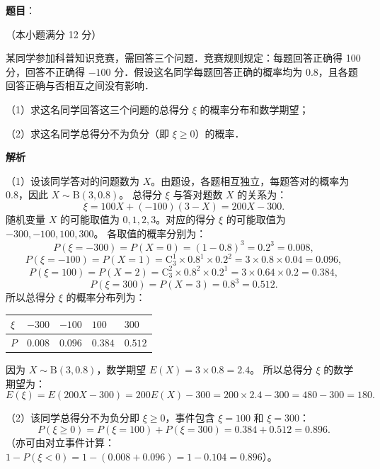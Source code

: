 \begin{answer}

\textbf{题目}：

（本小题满分 12 分）

某同学参加科普知识竞赛，需回答三个问题．竞赛规则规定：每题回答正确得 100 分，回答不正确得 $-100$ 分．假设这名同学每题回答正确的概率均为 0.8，且各题回答正确与否相互之间没有影响．

（1）求这名同学回答这三个问题的总得分 $\xi$ 的概率分布和数学期望；

（2）求这名同学总得分不为负分（即 $\xi\geqslant 0$）的概率．

\textbf{解析}

（1）设该同学答对的问题数为 $X$。由题设，各题相互独立，每题答对的概率为 0.8，因此 $X\sim\mathrm{B}(3,0.8)$。
总得分 $\xi$ 与答对题数 $X$ 的关系为：
\nopagebreak[4]
\[
\xi=100X+(-100)(3-X)=200X-300.
\]
随机变量 $X$ 的可能取值为 $0,1,2,3$。对应的得分 $\xi$ 的可能取值为 $-300,-100,100,300$。
各取值的概率分别为：
\nopagebreak[4]
\[
P(\xi=-300)=P(X=0)=(1-0.8)^3=0.2^3=0.008,
\]
\nopagebreak[4]
\[
P(\xi=-100)=P(X=1)=\mathrm{C}_3^1\times 0.8^1\times 0.2^2=3\times 0.8\times 0.04=0.096,
\]
\nopagebreak[4]
\[
P(\xi=100)=P(X=2)=\mathrm{C}_3^2\times 0.8^2\times 0.2^1=3\times 0.64\times 0.2=0.384,
\]
\nopagebreak[4]
\[
P(\xi=300)=P(X=3)=0.8^3=0.512.
\]
所以总得分 $\xi$ 的概率分布列为：

\begin{center}
\begin{tabular}{lllll}
\toprule
$\xi$ & $-300$ & $-100$ & $100$ & $300$ \\
\midrule
$P$ & $0.008$ & $0.096$ & $0.384$ & $0.512$ \\
\bottomrule
\end{tabular}
\end{center}

因为 $X\sim\mathrm{B}(3,0.8)$，数学期望 $E(X)=3\times 0.8=2.4$。
所以总得分 $\xi$ 的数学期望为：
\nopagebreak[4]
\[
E(\xi)=E(200X-300)=200E(X)-300=200\times 2.4-300=480-300=180.
\]

（2）该同学总得分不为负分即 $\xi\geqslant 0$，事件包含 $\xi=100$ 和 $\xi=300$：
\nopagebreak[4]
\[
P(\xi\geqslant 0)=P(\xi=100)+P(\xi=300)=0.384+0.512=0.896.
\]
（亦可由对立事件计算：$1-P(\xi<0)=1-(0.008+0.096)=1-0.104=0.896$）。


\end{answer}
